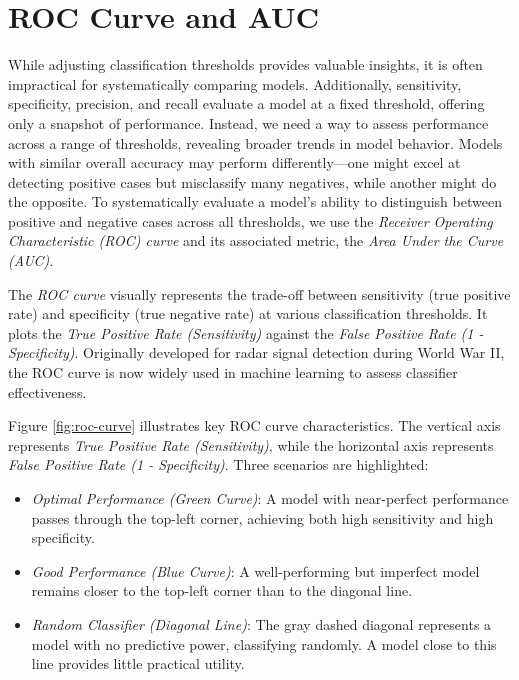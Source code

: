 \documentclass[
  11pt,
]{book}
\providecommand{\tightlist}{%
  \setlength{\itemsep}{0pt}\setlength{\parskip}{0pt}}
\theoremstyle{definition}
\theoremstyle{definition}
\theoremstyle{definition}
\theoremstyle{definition}
\theoremstyle{remark}
\begin{document}
\section{ROC Curve and AUC}\label{roc-curve-and-auc}

While adjusting classification thresholds provides valuable insights, it is often impractical for systematically comparing models. Additionally, sensitivity, specificity, precision, and recall evaluate a model at a fixed threshold, offering only a snapshot of performance. Instead, we need a way to assess performance across a range of thresholds, revealing broader trends in model behavior. Models with similar overall accuracy may perform differently---one might excel at detecting positive cases but misclassify many negatives, while another might do the opposite. To systematically evaluate a model's ability to distinguish between positive and negative cases across all thresholds, we use the \emph{Receiver Operating Characteristic (ROC) curve} and its associated metric, the \emph{Area Under the Curve (AUC)}.

The \emph{ROC curve} visually represents the trade-off between sensitivity (true positive rate) and specificity (true negative rate) at various classification thresholds. It plots the \emph{True Positive Rate (Sensitivity)} against the \emph{False Positive Rate (1 - Specificity)}. Originally developed for radar signal detection during World War II, the ROC curve is now widely used in machine learning to assess classifier effectiveness.

Figure \ref{fig:roc-curve} illustrates key ROC curve characteristics. The vertical axis represents \emph{True Positive Rate (Sensitivity)}, while the horizontal axis represents \emph{False Positive Rate (1 - Specificity)}. Three scenarios are highlighted:

\begin{itemize}
\tightlist
\item
  \emph{Optimal Performance (Green Curve)}: A model with near-perfect performance passes through the top-left corner, achieving both high sensitivity and high specificity.\\
\item
  \emph{Good Performance (Blue Curve)}: A well-performing but imperfect model remains closer to the top-left corner than to the diagonal line.\\
\item
  \emph{Random Classifier (Diagonal Line)}: The gray dashed diagonal represents a model with no predictive power, classifying randomly. A model close to this line provides little practical utility.
\end{itemize}
\end{document}

